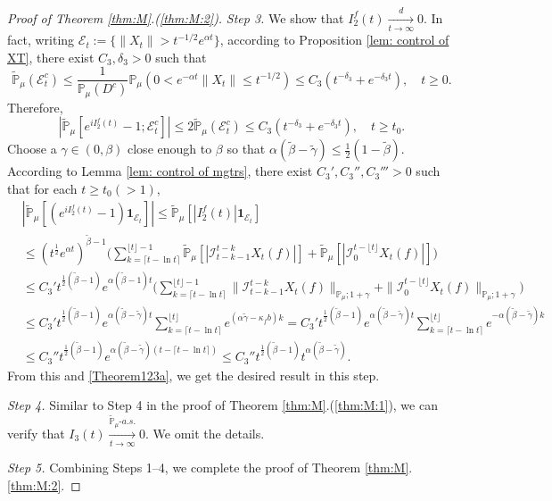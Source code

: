 \documentclass[EJP]{ejpecp} %
\begin{document}
\begin{proof}[Proof of Theorem \ref{thm:M}.(\ref{thm:M:2})]
	\emph{Step 3.} We show that $ I^f_2(t)\xrightarrow[t\to \infty]{d} 0$.
  	In fact, writing $\mathcal{E}_t:=\{\|X_t\|>t^{-1/2}e^{\alpha t}\}$, according to Proposition \ref{lem: control of XT}, there exist $C_3, \delta_3>0$ such that
\[
    \mathbb{\widetilde{P}}_{\mu}(\mathcal{E}^c_t)
    \leq \frac{1}{\mathbb{P}_{\mu}(D^c)}\mathbb{P}_{\mu}(0<e^{-\alpha t}\|X_t\|\leq t^{-1/2})\leq C_3( t^{-\delta_3}+e^{-\delta_3 t}), 
    \quad t\geq0.
\]
	Therefore,
\begin{equation}
\label{Theorem123a}
    |\mathbb{\widetilde{P}}_{\mu}[e^{i I^f_2(t)}-1;\mathcal{E}^c_t]|
    \leq 2\mathbb{\widetilde{P}}_{\mu}(\mathcal{E}^c_t)
    \leq C_3(t^{-\delta_3}+e^{-\delta_3 t}),
    \quad t\geq t_0.
\end{equation}
	Choose a $\gamma\in (0,\beta)$ close enough to $\beta$ so that $\alpha(\tilde \beta - \tilde \gamma) \leq \frac{1}{2}(1- \tilde \beta)$.
	According to Lemma \ref{lem: control of mgtrs}, there exist $C_3',C_3'',C_3'''>0$ such that for each $t\geq t_0 (>1)$,
\begin{align}
    & |\mathbb{\widetilde{P}}_{\mu} [ (e^{i I^f_2(t)}-1)\mathbf{1}_{\mathcal{E}_t}]|
   	\leq  \mathbb{\widetilde{P}}_{\mu} [ |I^f_2(t)|\mathbf{1}_{\mathcal{E}_t}] \\
    & \leq  (t^{\frac{1}{2}} e^{\alpha t} )^{\tilde \beta - 1}\Big(\sum_{k=\lceil t-\ln t \rceil}^{\lfloor t \rfloor - 1}\mathbb{\widetilde{P}}_{\mu} [| \mathcal{I}_{t-k-1}^{t-k} X_t(f) |] + \mathbb{\widetilde{P}}_{\mu}[| \mathcal{I}_{0}^{t-\lfloor t\rfloor} X_t(f)|]\Big) \\
    & \leq C_3' t^{\frac{1}{2}(\tilde \beta - 1)} e^{\alpha(\tilde \beta - 1)t}\Big(\sum_{k=\lceil t-\ln t \rceil}^{\lfloor t \rfloor - 1}\|\mathcal{I}_{t-k-1}^{t-k} X_t(f) \|_{\mathbb P_\mu; 1+\gamma} + \|\mathcal I_0^{t-\lfloor t \rfloor} X_t(f)\|_{\mathbb P_\mu;1+\gamma}\Big) \\
    & \leq C_3' t^{\frac{1}{2}(\tilde \beta - 1)} e^{\alpha (\tilde \beta - \tilde \gamma)t}\sum_{k=\lceil t-\ln t \rceil}^{\lfloor t \rfloor}  e^{(\alpha\tilde \gamma-\kappa_f b)k}
   	= C_3' t^{\frac{1}{2}(\tilde \beta - 1)} e^{\alpha(\tilde \beta - \tilde \gamma) t}\sum_{k=\lceil t-\ln t \rceil}^{\lfloor t \rfloor}  e^{-\alpha (\tilde \beta -\tilde \gamma) k}
    \\ & \leq C_3'' t^{\frac{1}{2}(\tilde \beta - 1)} e^{\alpha (\tilde \beta - \tilde \gamma)(t - \lceil t - \ln t\rceil)}
  	\leq C_3'' t^{\frac{1}{2}(\tilde \beta - 1)} t^{\alpha (\tilde \beta - \tilde \gamma)}.
\end{align}
	From this and \eqref{Theorem123a}, we get the desired result in this step.

	\emph{Step 4.} Similar to Step 4 in the proof of Theorem \ref{thm:M}.(\ref{thm:M:1}), we can verify that $I_3(t) \xrightarrow[t\to \infty]{\widetilde {\mathbb P}_\mu \text{-} a.s.} 0$.
	We omit the details.

	\emph{Step 5.} Combining Steps 1--4, we complete the proof of Theorem \ref{thm:M}.\eqref{thm:M:2}.
\end{proof}
\end{document}

